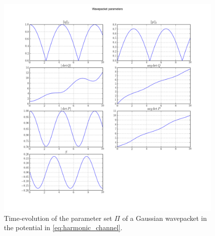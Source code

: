 \begin{figure}
  \centering
  \includegraphics[width=\linewidth]{./results/HO_FP/wavepacket_parameters_abs_ang_block0.png}
  \caption{Time-evolution of the parameter set $\Pi$ of a Gaussian wavepacket in
           the potential in \eqref{eq:harmonic_channel}.}
  \label{fig:hofp_parameters}
\end{figure}

